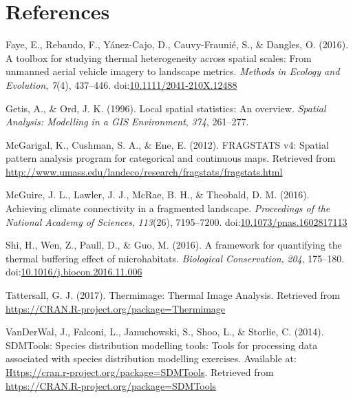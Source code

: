 \documentclass[12pt,british,a4paper,]{article}
\begin{document}
\pagebreak

\hypertarget{references}{%
\section*{References}\label{references}}

\hypertarget{refs}{}
\leavevmode\hypertarget{ref-faye_toolbox_2016}{}%
Faye, E., Rebaudo, F., Yánez-Cajo, D., Cauvy-Fraunié, S., \& Dangles, O. (2016). A toolbox for studying thermal heterogeneity across spatial scales: From unmanned aerial vehicle imagery to landscape metrics. \emph{Methods in Ecology and Evolution}, \emph{7}(4), 437--446. doi:\href{https://doi.org/10.1111/2041-210X.12488}{10.1111/2041-210X.12488}

\leavevmode\hypertarget{ref-getis_local_1996}{}%
Getis, A., \& Ord, J. K. (1996). Local spatial statistics: An overview. \emph{Spatial Analysis: Modelling in a GIS Environment}, \emph{374}, 261--277.

\leavevmode\hypertarget{ref-fragstats_2012}{}%
McGarigal, K., Cushman, S. A., \& Ene, E. (2012). FRAGSTATS v4: Spatial pattern analysis program for categorical and continuous maps. Retrieved from \url{http://www.umass.edu/landeco/research/fragstats/fragstats.html}

\leavevmode\hypertarget{ref-mcguire_achieving_2016}{}%
McGuire, J. L., Lawler, J. J., McRae, B. H., \& Theobald, D. M. (2016). Achieving climate connectivity in a fragmented landscape. \emph{Proceedings of the National Academy of Sciences}, \emph{113}(26), 7195--7200. doi:\href{https://doi.org/10.1073/pnas.1602817113}{10.1073/pnas.1602817113}

\leavevmode\hypertarget{ref-shi_framework_2016}{}%
Shi, H., Wen, Z., Paull, D., \& Guo, M. (2016). A framework for quantifying the thermal buffering effect of microhabitats. \emph{Biological Conservation}, \emph{204}, 175--180. doi:\href{https://doi.org/10.1016/j.biocon.2016.11.006}{10.1016/j.biocon.2016.11.006}

\leavevmode\hypertarget{ref-tattersall_thermimage:_2017}{}%
Tattersall, G. J. (2017). Thermimage: Thermal Image Analysis. Retrieved from \url{https://CRAN.R-project.org/package=Thermimage}

\leavevmode\hypertarget{ref-sdmtools_2014}{}%
VanDerWal, J., Falconi, L., Januchowski, S., Shoo, L., \& Storlie, C. (2014). SDMTools: Species distribution modelling tools: Tools for processing data associated with species distribution modelling exercises. Available at: \href{https://CRAN.R-project.org/package=SDMTools}{Https://cran.r-project.org/package=SDMTools}. Retrieved from \url{https://CRAN.R-project.org/package=SDMTools}
\end{document}
